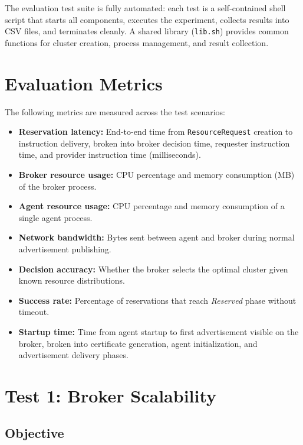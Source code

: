 The evaluation test suite is fully automated: each test is a self-contained shell script that starts all components, executes the experiment, collects results into CSV files, and terminates cleanly. A shared library (\texttt{lib.sh}) provides common functions for cluster creation, process management, and result collection.


\section{Evaluation Metrics}
\label{sec:eval-metrics}

The following metrics are measured across the test scenarios:

\begin{itemize}
    \item \textbf{Reservation latency:} End-to-end time from \texttt{ResourceRequest} creation to instruction delivery, broken into broker decision time, requester instruction time, and provider instruction time (milliseconds).
    \item \textbf{Broker resource usage:} CPU percentage and memory consumption (MB) of the broker process.
    \item \textbf{Agent resource usage:} CPU percentage and memory consumption of a single agent process.
    \item \textbf{Network bandwidth:} Bytes sent between agent and broker during normal advertisement publishing.
    \item \textbf{Decision accuracy:} Whether the broker selects the optimal cluster given known resource distributions.
    \item \textbf{Success rate:} Percentage of reservations that reach \textit{Reserved} phase without timeout.
    \item \textbf{Startup time:} Time from agent startup to first advertisement visible on the broker, broken into certificate generation, agent initialization, and advertisement delivery phases.
\end{itemize}


\section{Test 1: Broker Scalability}
\label{sec:test1}

\subsection{Objective}

